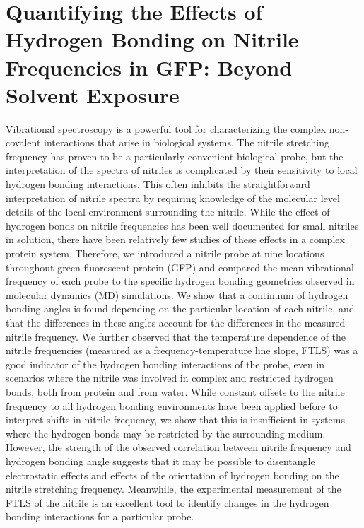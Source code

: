 \chapter{Quantifying the Effects of Hydrogen Bonding on Nitrile Frequencies in GFP: Beyond Solvent Exposure}\label{gfp-hbond}

Vibrational spectroscopy is a powerful tool for characterizing the complex non-covalent interactions that arise in biological systems.
The nitrile stretching frequency has proven to be a particularly convenient biological probe, but the interpretation of the spectra of nitriles is complicated by their sensitivity to local hydrogen bonding interactions.
This often inhibits the straightforward interpretation of nitrile spectra by requiring knowledge of the molecular level details of the local environment surrounding the nitrile.
While the effect of hydrogen bonds on nitrile frequencies has been well documented for small nitriles in solution, there have been relatively few studies of these effects in a complex protein system.
Therefore, we introduced a nitrile probe at nine locations throughout green fluorescent protein (GFP) and compared the mean vibrational frequency of each probe to the specific hydrogen bonding geometries observed in molecular dynamics (MD) simulations.
We show that a continuum of hydrogen bonding angles is found depending on the particular location of each nitrile, and that the differences in these angles account for the differences in the measured nitrile frequency.
We further observed that the temperature dependence of the nitrile frequencies (measured as a frequency-temperature line slope, FTLS) was a good indicator of the hydrogen bonding interactions of the probe, even in scenarios where the nitrile was involved in complex and restricted hydrogen bonds, both from protein and from water.
While constant offsets to the nitrile frequency to all hydrogen bonding environments have been applied before to interpret shifts in nitrile frequency, we show that this is insufficient in systems where the hydrogen bonds may be restricted by the surrounding medium.
However, the strength of the observed correlation between nitrile frequency and hydrogen bonding angle suggests that it may be possible to disentangle electrostatic effects and effects of the orientation of hydrogen bonding on the nitrile stretching frequency.
Meanwhile, the experimental measurement of the FTLS of the nitrile is an excellent tool to identify changes in the hydrogen bonding interactions for a particular probe.

